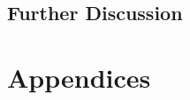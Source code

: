 \documentclass[msc,deptreport]{infthesis} %
\begin{document}
\section{Further Discussion}
\label{sec5.1:discusstion}





\chapter*{Appendices}

% 
% 
% 
\end{document}
